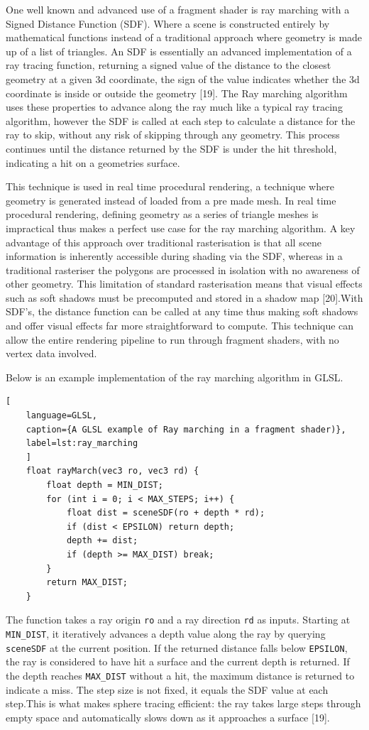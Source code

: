 \documentclass[]{final_report}
\begin{document}
One well known and advanced use of a fragment shader is ray marching with a Signed Distance Function (SDF). Where a scene is constructed entirely by mathematical functions instead of a traditional approach where geometry is made up of a list of triangles. An SDF is essentially an advanced implementation of a ray tracing function, returning a signed value of the distance to the closest geometry at a given 3d coordinate, the sign of the value indicates whether the 3d coordinate is inside or outside the geometry [19]. The Ray marching algorithm uses these properties to advance along the ray much like a typical ray tracing algorithm, however the SDF is called at each step to calculate a distance for the ray to skip, without any risk of skipping through any geometry. This process continues until the distance returned by the SDF is under the hit threshold, indicating a hit on a geometries surface.

This technique is used in real time procedural rendering, a technique where geometry is generated instead of loaded from a pre made mesh. In real time procedural rendering, defining geometry as a series of triangle meshes is impractical thus makes a perfect use case for the ray marching algorithm. A key advantage of this approach over traditional rasterisation is that all scene information is inherently accessible during shading via the SDF, whereas in a traditional rasteriser the polygons are processed in isolation with no awareness of other geometry. This limitation of standard rasterisation means that visual effects such as soft shadows must be precomputed and stored in a shadow map [20].With SDF's, the distance function can be called at any time thus making soft shadows and offer visual effects far more straightforward to compute. This technique can allow the entire rendering pipeline to run through fragment shaders, with no vertex data involved.

Below is an example implementation of the ray marching algorithm in GLSL.
\begin{lstlisting}[
	language=GLSL,
	caption={A GLSL example of Ray marching in a fragment shader)},
	label=lst:ray_marching
	]
	float rayMarch(vec3 ro, vec3 rd) {
		float depth = MIN_DIST;
		for (int i = 0; i < MAX_STEPS; i++) {
			float dist = sceneSDF(ro + depth * rd); 
			if (dist < EPSILON) return depth;       
			depth += dist;                          
			if (depth >= MAX_DIST) break;
		}
		return MAX_DIST; 
	}
\end{lstlisting}

The function takes a ray origin \texttt{ro} and a ray direction \texttt{rd} as inputs. 
Starting at \texttt{MIN\_DIST}, it iteratively advances a depth value along the ray by 
querying \texttt{sceneSDF} at the current position. If the returned distance falls below 
\texttt{EPSILON}, the ray is considered to have hit a surface and the current 
depth is returned. If the depth reaches \texttt{MAX\_DIST} without a hit, the maximum 
distance is returned to indicate a miss. The step size is not fixed, it equals the SDF 
value at each step.This is what makes sphere tracing efficient: the ray takes large 
steps through empty space and automatically slows down as it approaches a surface 
[19].
\end{document}
